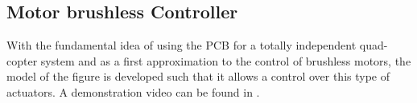 \subsection{Motor brushless Controller}
With the fundamental idea of using the PCB for a totally independent quad-copter system and as a first approximation to the control of brushless motors, the model of the figure is developed such that it allows a control over this type of actuators.
A demonstration video can be found in \cite{brushless1}.